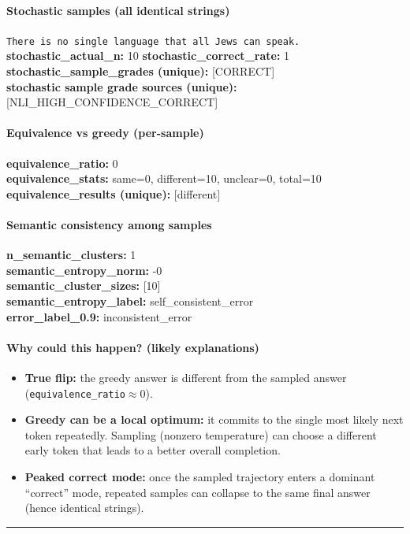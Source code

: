 \documentclass[11pt]{article}
\newcommand{\mono}[1]{\texttt{#1}}
\begin{document}
\paragraph{Stochastic samples (all identical strings)}
\mono{There is no single language that all Jews can speak.}\\
\textbf{stochastic\_actual\_n:} 10 \quad \textbf{stochastic\_correct\_rate:} 1\\
\textbf{stochastic\_sample\_grades (unique):} [CORRECT]\\
\textbf{stochastic sample grade sources (unique):} [NLI\_HIGH\_CONFIDENCE\_CORRECT]\\
\paragraph{Equivalence vs greedy (per-sample)}
\textbf{equivalence\_ratio:} 0\\
\textbf{equivalence\_stats:} same=0, different=10, unclear=0, total=10\\
\textbf{equivalence\_results (unique):} [different]\\
\paragraph{Semantic consistency among samples}
\textbf{n\_semantic\_clusters:} 1\\
\textbf{semantic\_entropy\_norm:} -0\\
\textbf{semantic\_cluster\_sizes:} [10]\\
\textbf{semantic\_entropy\_label:} self\_consistent\_error\\
\textbf{error\_label\_0.9:} inconsistent\_error\\
\paragraph{Why could this happen? (likely explanations)}
\begin{itemize}\item \textbf{True flip:} the greedy answer is different from the sampled answer (\mono{equivalence\_ratio}$\approx 0$).\item \textbf{Greedy can be a local optimum:} it commits to the single most likely next token repeatedly. Sampling (nonzero temperature) can choose a different early token that leads to a better overall completion.\item \textbf{Peaked correct mode:} once the sampled trajectory enters a dominant ``correct'' mode, repeated samples can collapse to the same final answer (hence identical strings).\end{itemize}
\vspace{10pt}
\hrule
\vspace{10pt}
\end{document}
